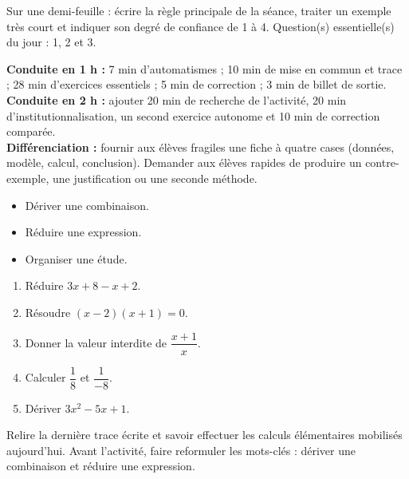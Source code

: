 \begin{sortie}Sur une demi-feuille : écrire la règle principale de la séance, traiter un exemple très court et indiquer son degré de confiance de 1 à 4. Question(s) essentielle(s) du jour : 1, 2 et 3.\end{sortie}

\ifprof
\begin{methode}
\textbf{Conduite en 1 h :} 7 min d'automatismes ; 10 min de mise en commun et trace ; 28 min d'exercices essentiels ; 5 min de correction ; 3 min de billet de sortie.\\
\textbf{Conduite en 2 h :} ajouter 20 min de recherche de l'activité, 20 min d'institutionnalisation, un second exercice autonome et 10 min de correction comparée.\\
\textbf{Différenciation :} fournir aux élèves fragiles une fiche à quatre cases (données, modèle, calcul, conclusion). Demander aux élèves rapides de produire un contre-exemple, une justification ou une seconde méthode.
\end{methode}
\fi
{}
\begin{objectifs}\begin{itemize}\item Dériver une combinaison.\item Réduire une expression.\item Organiser une étude.\end{itemize}\end{objectifs}
\begin{automatismes}\begin{enumerate}\item Réduire $3x+8-x+2$. \item Résoudre $(x-2)(x+1)=0$. \item Donner la valeur interdite de $\dfrac{x+1}{x}$. \item Calculer $\dfrac1{8}$ et $\dfrac1{-8}$. \item Dériver $3x^2-5x+1$. \end{enumerate}\end{automatismes}
\begin{prerequis}Relire la dernière trace écrite et savoir effectuer les calculs élémentaires mobilisés aujourd'hui. Avant l'activité, faire reformuler les mots-clés : dériver une combinaison et réduire une expression.\end{prerequis}

